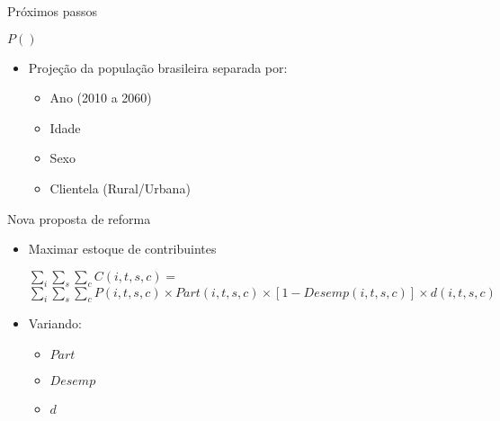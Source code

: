 \begin{frame}{Próximos passos}
  \begin{block}{$P()$}
    \begin{itemize}
      \item Projeção da população brasileira separada por:
      \begin{itemize}
         \item Ano (2010 a 2060)
         \item Idade
         \item Sexo
         \item Clientela (Rural/Urbana)
      \end{itemize}
    \end{itemize}
  \end{block}
  \begin{block}{Nova proposta de reforma}
    \begin{itemize}
      \item Maximar estoque de contribuintes
      \scriptsize
          \begin{center}
          $\sum_i \sum_s \sum_c C(i,t,s,c) =$ \\
           $\sum_i \sum_s \sum_c P(i,t,s,c) \times Part(i,t,s,c) \times [1-Desemp(i,t,s,c)] \times d(i,t,s,c)$
          \end{center}
     \item Variando:
      \begin{itemize}
          \scriptsize
          \item $Part$   %
          \item $Desemp$ %
          \item $d$ %
      \end{itemize}
    \end{itemize}
  \end{block}
\end{frame}



